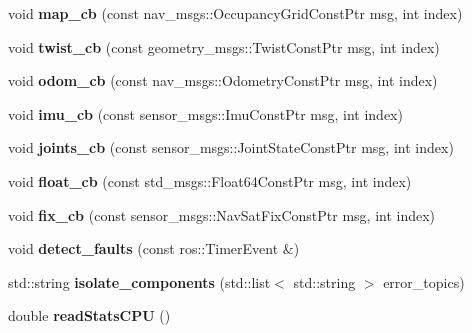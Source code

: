 \begin{DoxyCompactItemize}
\mbox{\label{classMainMonitor_a23981ef5b2184964ee86b2ac41742de5}} 
void {\bfseries map\+\_\+cb} (const nav\+\_\+msgs\+::\+Occupancy\+Grid\+Const\+Ptr msg, int index)
\item 
\mbox{\label{classMainMonitor_a3bcf3c5b43da2359c12a3cd3476ec169}} 
void {\bfseries twist\+\_\+cb} (const geometry\+\_\+msgs\+::\+Twist\+Const\+Ptr msg, int index)
\item 
\mbox{\label{classMainMonitor_a18c044470d5e73b2615f133231abd248}} 
void {\bfseries odom\+\_\+cb} (const nav\+\_\+msgs\+::\+Odometry\+Const\+Ptr msg, int index)
\item 
\mbox{\label{classMainMonitor_a3b6101bb1e2913cf28df098870ef6f5d}} 
void {\bfseries imu\+\_\+cb} (const sensor\+\_\+msgs\+::\+Imu\+Const\+Ptr msg, int index)
\item 
\mbox{\label{classMainMonitor_ac1e304dea179bfb64b38756bf42009d4}} 
void {\bfseries joints\+\_\+cb} (const sensor\+\_\+msgs\+::\+Joint\+State\+Const\+Ptr msg, int index)
\item 
\mbox{\label{classMainMonitor_a7947b97434620e01fe8924106cafa9ad}} 
void {\bfseries float\+\_\+cb} (const std\+\_\+msgs\+::\+Float64\+Const\+Ptr msg, int index)
\item 
\mbox{\label{classMainMonitor_a905f5f6fbe4637526857d71c8db9d3fb}} 
void {\bfseries fix\+\_\+cb} (const sensor\+\_\+msgs\+::\+Nav\+Sat\+Fix\+Const\+Ptr msg, int index)
\item 
\mbox{\label{classMainMonitor_a4272b134e83aecdd22fc47585b7692f2}} 
void {\bfseries detect\+\_\+faults} (const ros\+::\+Timer\+Event \&)
\item 
\mbox{\label{classMainMonitor_ac025ffed45202bb9214598caa344a02d}} 
std\+::string {\bfseries isolate\+\_\+components} (std\+::list$<$ std\+::string $>$ error\+\_\+topics)
\item 
\mbox{\label{classMainMonitor_a432c2be28f379f2f6c3969c58031ca6f}} 
double {\bfseries read\+Stats\+C\+PU} ()
\end{DoxyCompactItemize}


